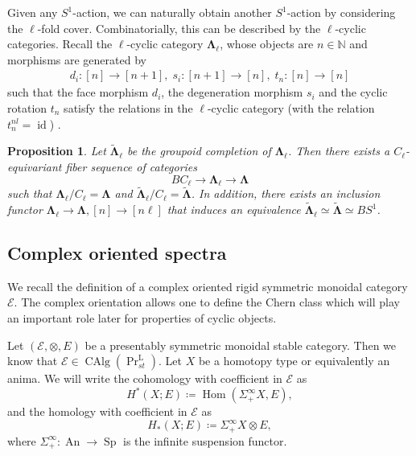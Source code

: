 \documentclass[11pt]{amsart}
\numberwithin{equation}{section}
\theoremstyle{plain}
\newtheorem{Prop}[prop]{Proposition}
\theoremstyle{definition}
\theoremstyle{remark}
\newcommand{\bN} { {\mathbb{N}}}
\newcommand{\cE} { {\mathcal{E}}}
\newcommand{\id}{{\operatorname{id}}}
\newcommand\CAlg{ {\operatorname{CAlg}} }
\newcommand\Hom{\operatorname{Hom}}
\newcommand\PrLst{  {  \operatorname{Pr}^{\operatorname{L} }_{st} } }
\newcommand\Sp{ {\operatorname{Sp} } }
\newcommand\An{ {\operatorname{An} } }
\begin{document}
Given any $S^1$-action, we can naturally obtain another $S^1$-action by considering the $\ell$-fold cover. Combinatorially, this can be described by the $\ell$-cyclic categories. Recall the $\ell$-cyclic category $\boldsymbol{\Lambda}_\ell$, whose objects are $n \in \bN$ and morphisms are generated by
\begin{align*}
    d_i: [n] \to [n+1], \;s_i: [n+1] \to [n], \;t_{n}: [n] \to [n]
\end{align*}
such that the face morphism $d_i$, the degeneration morphism $s_i$ and the cyclic rotation $t_n$ satisfy the relations in the $\ell$-cyclic category (with the relation $t_n^{nl} = \id$) \cite[Lecture 7]{Kaledin}.

\begin{Prop}\label{prop:ellcyclic}
    Let $\widetilde{\boldsymbol{\Lambda}}_\ell$ be the groupoid completion of $\boldsymbol{\Lambda}_\ell$. Then there exists a $C_\ell$-equivariant fiber sequence of categories
    \[BC_\ell \to \boldsymbol{\Lambda}_\ell \to \boldsymbol{\Lambda}\]
    such that $\boldsymbol{\Lambda}_\ell/{C_\ell} = \boldsymbol{\Lambda}$ and $\widetilde{\boldsymbol{\Lambda}}_\ell/{C_\ell} = \widetilde{\boldsymbol{\Lambda}}$. In addition, there exists an inclusion functor $\boldsymbol{\Lambda}_\ell \to \boldsymbol{\Lambda}, [n] \to [n\ell]$ that induces an equivalence $\widetilde{\boldsymbol{\Lambda}}_\ell \simeq \widetilde{\boldsymbol{\Lambda}} \simeq BS^1$.
\end{Prop}



\subsection{Complex oriented spectra}
We recall the definition of a complex oriented rigid symmetric monoidal category $\cE$. The complex orientation allows one to define the Chern class which will play an important role later for properties of cyclic objects.

Let $(\cE, \otimes, E)$ be a presentably symmetric monoidal stable category. Then we know that $\cE \in \CAlg(\PrLst)$. Let $X$ be a homotopy type or equivalently an anima. We will write the cohomology with coefficient in $\cE$ as
\[H^*(X; E) \coloneqq \Hom(\Sigma^\infty_+X,  E),\]
and the homology with coefficient in $\cE$ as
\[H_*(X; E) \coloneqq \Sigma^\infty_+X \otimes E,\]
where $\Sigma^\infty_+: \An \to \Sp$ is the infinite suspension functor.
\end{document}
